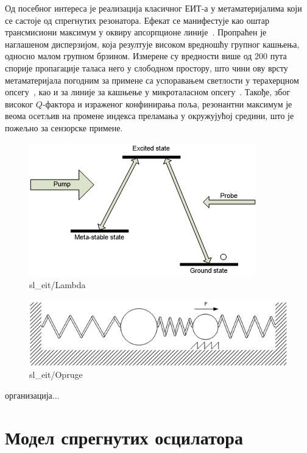 \documentclass[main.tex]{subfiles}
\begin{document}
Од посебног интереса је реализација класичног ЕИТ-а у метаматеријалима који се састоје од спрегнутих резонатора. Ефекат се манифестује као оштар трансмисиони максимум у оквиру апсорпционе линије~\cite{tassin:09,cihan,mr05}. Пропраћен је наглашеном дисперзијом, која резултује високом вредношћу групног кашњења, односно малом групном брзином. Измерене су вредности више од 200 пута спорије пропагације таласа него у слободном простору, што чини ову врсту метаматеријала погодним за примене са успоравањем светлости у терахерцном опсегу~\cite{tassin:09}, као и за линије за кашњење у микроталасном опсегу~\cite{mr05}. Такође, због високог $Q$-фактора и израженог конфинирања поља, резонантни максимум је веома осетљив на промене индекса преламања у окружујућој средини, што је пожељно за сензорске примене.
\begin{figure}[h]
    \centering
    \includegraphics[width=0.8\linewidth]{sl_eit/lambda.png}
    \caption{sl_eit/Lambda}
    \label{fig:sl_eit/lambda}
\end{figure}
\begin{figure}[h]
    \centering
    \includegraphics[width=0.8\linewidth]{sl_eit/opruge.png}
    \caption{sl_eit/Opruge}
    \label{fig:sl_eit/opruge}
\end{figure}

организација...

\section{Модел спрегнутих осцилатора}%
\label{sec:model_spregnutikh_ostsilatora}
\end{document}
